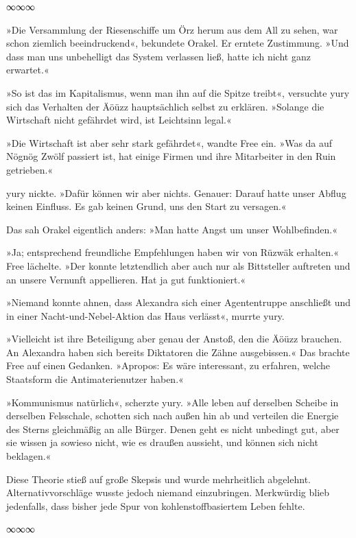 \begin{center}
∞∞∞
\end{center}

»Die Versammlung der Riesenschiffe um Örz herum aus dem All zu sehen, war schon ziemlich beeindruckend«, bekundete Orakel. Er erntete Zustimmung. »Und dass man uns unbehelligt das System verlassen ließ, hatte ich nicht ganz erwartet.«

»So ist das im Kapitalismus, wenn man ihn auf die Spitze treibt«, versuchte yury sich das Verhalten der Äöüzz hauptsächlich selbst zu erklären. »Solange die Wirtschaft nicht gefährdet wird, ist Leichtsinn legal.«

»Die Wirtschaft ist aber sehr stark gefährdet«, wandte Free ein. »Was da auf Nögnög Zwölf passiert ist, hat einige Firmen und ihre Mitarbeiter in den Ruin getrieben.«

yury nickte. »Dafür können wir aber nichts. Genauer: Darauf hatte unser Abflug keinen Einfluss. Es gab keinen Grund, uns den Start zu versagen.«

Das sah Orakel eigentlich anders: »Man hatte Angst um unser Wohlbefinden.«

»Ja; entsprechend freundliche Empfehlungen haben wir von Rüzwäk erhalten.« Free lächelte. »Der konnte letztendlich aber auch nur als Bittsteller auftreten und an unsere Vernunft appellieren. Hat ja gut funktioniert.«

»Niemand konnte ahnen, dass Alexandra sich einer Agententruppe anschließt und in einer Nacht-und-Nebel-Aktion das Haus verlässt«, murrte yury.

»Vielleicht ist ihre Beteiligung aber genau der Anstoß, den die Äöüzz brauchen. An Alexandra haben sich bereits Diktatoren die Zähne ausgebissen.« Das brachte Free auf einen Gedanken. »Apropos: Es wäre interessant, zu erfahren, welche Staatsform die Antimaterienutzer haben.«

»Kommunismus natürlich«, scherzte yury. »Alle leben auf derselben Scheibe in derselben Felsschale, schotten sich nach außen hin ab und verteilen die Energie des Sterns gleichmäßig an alle Bürger. Denen geht es nicht unbedingt gut, aber sie wissen ja sowieso nicht, wie es draußen aussieht, und können sich nicht beklagen.«

Diese Theorie stieß auf große Skepsis und wurde mehrheitlich abgelehnt. Alternativvorschläge wusste jedoch niemand einzubringen. Merkwürdig blieb jedenfalls, dass bisher jede Spur von kohlenstoffbasiertem Leben fehlte.

\begin{center}
∞∞∞
\end{center}

